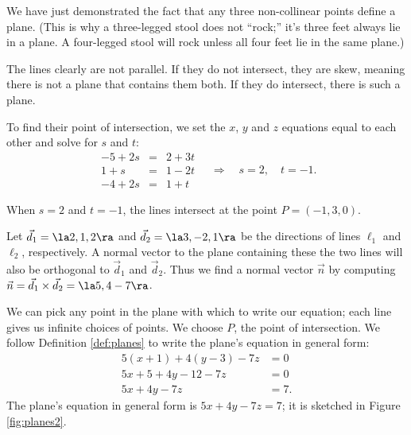 We have just demonstrated the fact that any three non-collinear points define a plane. (This is why a three-legged stool does not ``rock;'' it's three feet always lie in a plane. A four-legged stool will rock unless all four feet lie in the same plane.)

{The lines clearly are not parallel. If they do not intersect, they are skew, meaning there is not a plane that contains them both. If they do intersect, there is such a plane. 

To find their point of intersection, we set the $x$, $y$ and $z$ equations equal to each other and solve for $s$ and $t$:
$$\begin{array}{ccc}
-5+2s &=&2+3t \\ 1+s &=& 1-2t \\ -4+2s &=& 1+t \end{array}\quad  \Rightarrow  \quad s=2,\quad t=-1.$$

When $s=2$ and $t=-1$, the lines intersect at the point $P= (-1,3,0)$. 

Let $\vec d_1 = \la 2,1,2\ra$ and $\vec d_2=\la 3,-2,1\ra$ be the directions of lines $\ell_1$ and $\ell_2$, respectively. A normal vector to the plane containing these the two lines will also be orthogonal to $\vec d_1$ and $\vec d_2$. Thus we find a normal vector $\vec n$ by computing $\vec n = \vec d_1 \times \vec d_2= \la 5,4-7\ra$.

We can pick any point in the plane with which to write our equation; each line gives us infinite choices of points. We choose $P$, the point of intersection. We follow Definition \ref{def:planes} to write the plane's equation in general form:
\begin{align*}
5(x+1) +4(y-3) -7z &= 0 \\
5x + 5 + 4y-12 -7z &= 0\\
5x+4y-7z &= 7.
\end{align*}
The plane's equation in general form is $5x+4y-7z=7$; it is sketched in Figure \ref{fig:planes2}.
}

